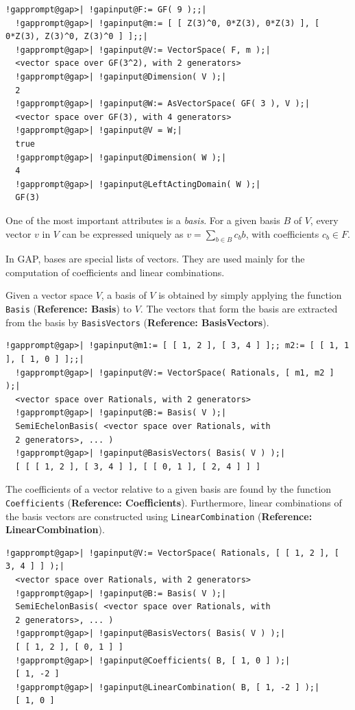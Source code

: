 \documentclass[a4paper,11pt]{report}
\begin{document}
{{ 
\begin{Verbatim}[commandchars=!@|,fontsize=\small,frame=single,label=Example]
  !gapprompt@gap>| !gapinput@F:= GF( 9 );;|
  !gapprompt@gap>| !gapinput@m:= [ [ Z(3)^0, 0*Z(3), 0*Z(3) ], [ 0*Z(3), Z(3)^0, Z(3)^0 ] ];;|
  !gapprompt@gap>| !gapinput@V:= VectorSpace( F, m );|
  <vector space over GF(3^2), with 2 generators>
  !gapprompt@gap>| !gapinput@Dimension( V );|
  2
  !gapprompt@gap>| !gapinput@W:= AsVectorSpace( GF( 3 ), V );|
  <vector space over GF(3), with 4 generators>
  !gapprompt@gap>| !gapinput@V = W;|
  true
  !gapprompt@gap>| !gapinput@Dimension( W );|
  4
  !gapprompt@gap>| !gapinput@LeftActingDomain( W );|
  GF(3)
\end{Verbatim}
 

 One of the most important attributes is a \emph{basis}. For a given basis $B$ of $V$, every vector $v$ in $V$ can be expressed uniquely as $v = \sum_{b \in B} c_b b$, with coefficients $c_b \in F$. 

 In \textsf{GAP}, bases are special lists of vectors. They are used mainly for the computation
of coefficients and linear combinations. 

 Given a vector space $V$, a basis of $V$ is obtained by simply applying the function \texttt{Basis} (\textbf{Reference: Basis}) to $V$. The vectors that form the basis are extracted from the basis by \texttt{BasisVectors} (\textbf{Reference: BasisVectors}). 

 
\begin{Verbatim}[commandchars=!@|,fontsize=\small,frame=single,label=Example]
  !gapprompt@gap>| !gapinput@m1:= [ [ 1, 2 ], [ 3, 4 ] ];; m2:= [ [ 1, 1 ], [ 1, 0 ] ];;|
  !gapprompt@gap>| !gapinput@V:= VectorSpace( Rationals, [ m1, m2 ] );|
  <vector space over Rationals, with 2 generators>
  !gapprompt@gap>| !gapinput@B:= Basis( V );|
  SemiEchelonBasis( <vector space over Rationals, with
  2 generators>, ... )
  !gapprompt@gap>| !gapinput@BasisVectors( Basis( V ) );|
  [ [ [ 1, 2 ], [ 3, 4 ] ], [ [ 0, 1 ], [ 2, 4 ] ] ]
\end{Verbatim}
 

 The coefficients of a vector relative to a given basis are found by the
function \texttt{Coefficients} (\textbf{Reference: Coefficients}). Furthermore, linear combinations of the basis vectors are constructed using \texttt{LinearCombination} (\textbf{Reference: LinearCombination}). 

 
\begin{Verbatim}[commandchars=!@|,fontsize=\small,frame=single,label=Example]
  !gapprompt@gap>| !gapinput@V:= VectorSpace( Rationals, [ [ 1, 2 ], [ 3, 4 ] ] );|
  <vector space over Rationals, with 2 generators>
  !gapprompt@gap>| !gapinput@B:= Basis( V );|
  SemiEchelonBasis( <vector space over Rationals, with
  2 generators>, ... )
  !gapprompt@gap>| !gapinput@BasisVectors( Basis( V ) );|
  [ [ 1, 2 ], [ 0, 1 ] ]
  !gapprompt@gap>| !gapinput@Coefficients( B, [ 1, 0 ] );|
  [ 1, -2 ]
  !gapprompt@gap>| !gapinput@LinearCombination( B, [ 1, -2 ] );|
  [ 1, 0 ]
\end{Verbatim}
 

}}
\end{document}
